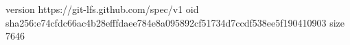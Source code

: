version https://git-lfs.github.com/spec/v1
oid sha256:e74cfdc66ac4b28efffdaee784e8a095892cf51734d7ccdf538ee5f190410903
size 7646

